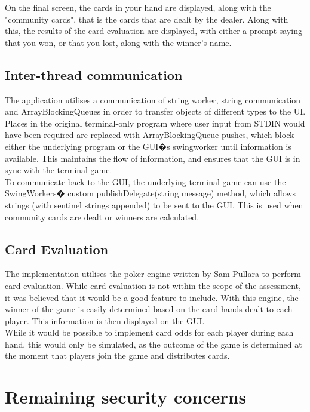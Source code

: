 \documentclass[11pt, oneside]{article}   	%
\begin{document}
On the final screen, the cards in your hand are displayed, along with the "community cards", that is the cards that are dealt by the dealer. Along with this, the results of the card evaluation are displayed, with either a prompt saying that you won, or that you lost, along with the winner's name.

\subsection {Inter-thread communication}

The application utilises a communication of string worker, string communication and ArrayBlockingQueues in order to transfer objects of different types to the UI. Places in the original terminal-only program where user input from STDIN would have been required are replaced with ArrayBlockingQueue pushes, which block either the underlying program or the GUI�s swingworker until information is available. This maintains the flow of information, and ensures that the GUI is in sync with the terminal game.\\

To communicate back to the GUI, the underlying terminal game can use the SwingWorkers� custom publishDelegate(string message) method, which allows strings (with sentinel strings appended) to be sent to the GUI. This is used when community cards are dealt or winners are calculated.

\subsection{Card Evaluation}

The implementation utilises the poker engine written by Sam Pullara to perform card evaluation. While card evaluation is not within the scope of the assessment, it was believed that it would be a good feature to include. With this engine, the winner of the game is easily determined based on the card hands dealt to each player. This information is then displayed on the GUI.\\

While it would be possible to implement card odds for each player during each hand, this would only be simulated, as the outcome of the game is determined at the moment that players join the game and distributes cards.

\section{Remaining security concerns}
\label{sec:securityConcerns}
\end{document}
